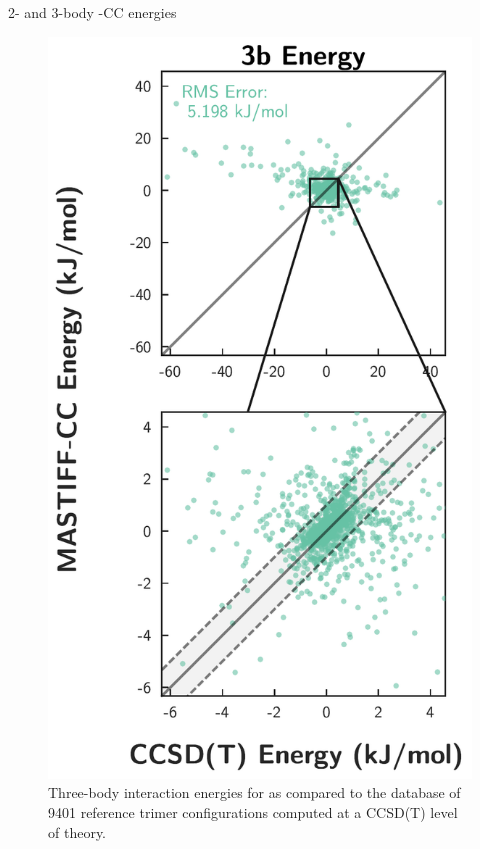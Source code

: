 \begin{section}{2- and 3-body \mastiff-CC \texorpdfstring{\co} {} energies}
\label{sec:mastiff-co2_snapshots}

    \begin{figure}
      \includegraphics[height=0.8\textwidth]{anisotropic/si/co2_snapshots/trimers_helmann/co2_trimer_comparison.pdf}
        \caption{
        Three-body interaction energies for \co as compared to the
         database of
        9401 reference trimer configurations computed at a CCSD(T) level of theory.
                }
    \label{fig:hellmann}
    \end{figure}


\end{section}
